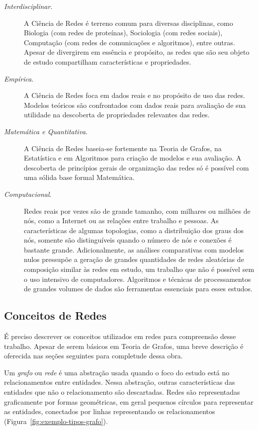 \documentclass[12pt,a4paper]{article}
\begin{document}
\begin{description} \label{desc:ciencia-de-redes}
	\item[\textit{Interdisciplinar}.] A Ciência de Redes é terreno comum para diversas disciplinas, como Biologia (com redes de proteínas), Sociologia (com redes sociais), Computação (com redes de comunicações e algoritmos), entre outras. Apesar de divergirem em essência e propósito, as redes que são seu objeto de estudo compartilham características e propriedades.
    
    \item[\textit{Empírica}.] A Ciência de Redes foca em dados reais e no propósito de uso das redes. Modelos teóricos são confrontados com dados reais para avaliação de sua utilidade na descoberta de propriedades relevantes das redes.
    
    \item[\textit{Matemática e Quantitativa}.] A Ciência de Redes baseia-se fortemente na Teoria de Grafos, na Estatística e em Algoritmos para criação de modelos e sua avaliação. A descoberta de princípios gerais de organização das redes só é possível com uma sólida base formal Matemática.
    
    \item[\textit{Computacional}.] Redes reais por vezes são de grande tamanho, com milhares ou milhões de nós, como a Internet ou as relações entre trabalho e pessoas. As características de algumas topologias, como a distribuição dos graus dos nós, somente são distinguíveis quando o número de nós e conexões é bastante grande. Adicionalmente, as análises comparativas com modelos nulos pressupõe a geração de grandes quantidades de redes aleatórias de composição similar às redes em estudo, um trabalho que não é possível sem o uso intensivo de computadores. Algoritmos e técnicas de processamentos de grandes volumes de dados são ferramentas essenciais para esses estudos.
\end{description}

\subsection{Conceitos de Redes}

É preciso descrever os conceitos utilizados em redes para compreensão desse trabalho. Apesar de serem básicos em Teoria de Grafos, uma breve descrição é oferecida nas seções seguintes para completude dessa obra.

Um \textit{grafo} ou \textit{rede} é uma abstração usada quando o foco do estudo está no relacionamentos entre entidades. Nessa abstração, outras características das entidades que não o relacionamento são descartadas. Redes são representadas graficamente por formas geométricas, em geral pequenos círculos para representar as entidades, conectados por linhas representando os relacionamentos (Figura~\ref{fig:exemplo-tipos-grafo}).
\end{document}
